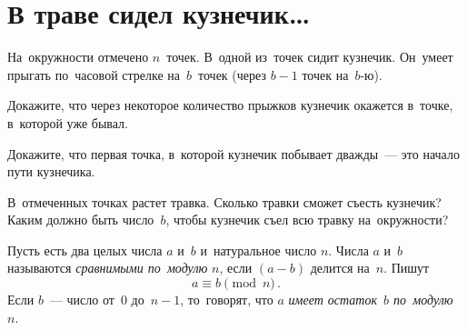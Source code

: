 
\section*{В траве сидел кузнечик\ldots}



На~окружности отмечено $n$~точек.
В~одной из~точек сидит кузнечик.
Он~умеет прыгать по~часовой стрелке на~$b$~точек (через $b-1$ точек на~$b$-ю).

\begin{problems}

Докажите, что через некоторое количество прыжков кузнечик окажется в~точке,
в~которой уже бывал.

\item
Докажите, что первая точка, в~которой кузнечик побывает дважды~--- это начало
пути кузнечика.

\item
В~отмеченных точках растет травка.
Сколько травки сможет съесть кузнечик?
Каким должно быть число~$b$, чтобы кузнечик съел всю травку на~окружности?

\end{problems}

Пусть есть два целых числа $a$ и~$b$ и~натуральное число $n$.
Числа $a$ и~$b$ называются \emph{сравнимыми по~модулю} $n$, если
$(a - b)$ делится на~$n$.
Пишут
\[
    a \equiv b \pmod n
\,.\]
Если $b$~--- число от~$0$ до~$n - 1$, то~говорят, что $a$
\emph{имеет остаток~$b$ по~модулю~$n$}.

